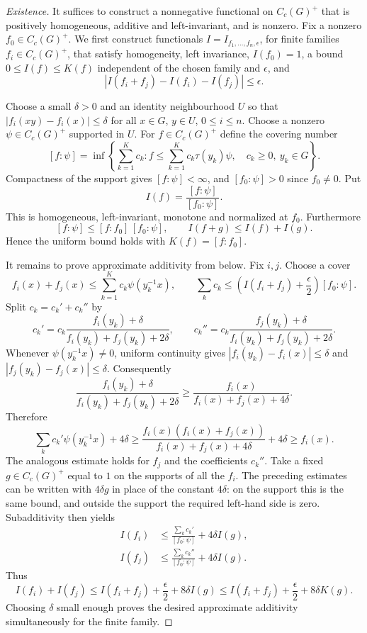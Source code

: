 \documentclass[UTF8,11pt]{ctexart}
\theoremstyle{definition}
\begin{document}
\begin{proof}[Existence]
It suffices to construct a nonnegative functional on $C_c(G)^+$ that is
positively homogeneous, additive and left-invariant, and is nonzero.
Fix a nonzero $f_0\in C_c(G)^+$. We first construct functionals
$I=I_{f_1,\ldots,f_n,\epsilon}$, for finite families $f_i\in C_c(G)^+$,
that satisfy homogeneity, left invariance, $I(f_0)=1$, a bound
$0\leq I(f)\leq K(f)$ independent of the chosen family and $\epsilon$, and
\[
 |I(f_i+f_j)-I(f_i)-I(f_j)|\leq\epsilon.
\]

Choose a small $\delta>0$ and an identity neighbourhood $U$ so that
$|f_i(xy)-f_i(x)|\leq\delta$ for all $x\in G$, $y\in U$, $0\leq i\leq n$.
Choose a nonzero $\psi\in C_c(G)^+$ supported in $U$. For $f\in C_c(G)^+$
define the covering number
\[
 [f:\psi]=\inf\left\{\sum_{k=1}^Kc_k:
 f\leq\sum_{k=1}^Kc_k\tau(y_k)\psi,\quad c_k\geq0,\ y_k\in G\right\}.
\]
Compactness of the support gives $[f:\psi]<\infty$, and
$[f_0:\psi]>0$ since $f_0\ne0$. Put
\[
 I(f)=\frac{[f:\psi]}{[f_0:\psi]}.
\]
This is homogeneous, left-invariant, monotone and normalized at $f_0$.
Furthermore
\[
 [f:\psi]\leq[f:f_0]\,[f_0:\psi],\qquad
 I(f+g)\leq I(f)+I(g).
\]
Hence the uniform bound holds with $K(f)=[f:f_0]$.

It remains to prove approximate additivity from below. Fix $i,j$. Choose a
cover
\[
 f_i(x)+f_j(x)\leq\sum_{k=1}^Kc_k\psi(y_k^{-1}x),\qquad
 \sum_kc_k\leq\left(I(f_i+f_j)+\frac\epsilon2\right)[f_0:\psi].
\]
Split $c_k=c_k'+c_k''$ by
\[
 c_k'=c_k\frac{f_i(y_k)+\delta}{f_i(y_k)+f_j(y_k)+2\delta},\qquad
 c_k''=c_k\frac{f_j(y_k)+\delta}{f_i(y_k)+f_j(y_k)+2\delta}.
\]
Whenever $\psi(y_k^{-1}x)\ne0$, uniform continuity gives
$|f_i(y_k)-f_i(x)|\leq\delta$ and $|f_j(y_k)-f_j(x)|\leq\delta$.
Consequently
\[
 \frac{f_i(y_k)+\delta}{f_i(y_k)+f_j(y_k)+2\delta}
 \geq\frac{f_i(x)}{f_i(x)+f_j(x)+4\delta}.
\]
Therefore
\[
 \sum_kc_k'\psi(y_k^{-1}x)+4\delta
 \geq\frac{f_i(x)(f_i(x)+f_j(x))}{f_i(x)+f_j(x)+4\delta}+4\delta
 \geq f_i(x).
\]
The analogous estimate holds for $f_j$ and the coefficients $c_k''$.
Take a fixed $g\in C_c(G)^+$ equal to $1$ on the supports of all the $f_i$.
The preceding estimates can be written with $4\delta g$ in place of the
constant $4\delta$: on the support this is the same bound, and outside the
support the required left-hand side is zero. Subadditivity then yields
\[
\begin{aligned}
 I(f_i)&\leq\frac{\sum_kc_k'}{[f_0:\psi]}+4\delta I(g),\\
 I(f_j)&\leq\frac{\sum_kc_k''}{[f_0:\psi]}+4\delta I(g).
\end{aligned}
\]
Thus
\[
 I(f_i)+I(f_j)\leq I(f_i+f_j)+\frac\epsilon2+8\delta I(g)
 \leq I(f_i+f_j)+\frac\epsilon2+8\delta K(g).
\]
Choosing $\delta$ small enough proves the desired approximate additivity
simultaneously for the finite family.


\end{proof}
\end{document}

